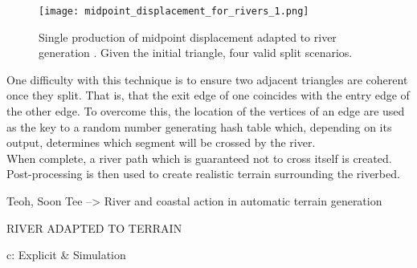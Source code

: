 \begin{figure}[h]
  \centering
	\label{Single production of midpoint displacement adapted to river generation. Given the initial triangle, four valid split scenarios. }
	\texttt{[image: midpoint\_displacement\_for\_rivers\_1.png]}
	\caption{Single production of midpoint displacement adapted to river generation \cite{Prusinkiewicz1993}. Given the initial triangle, four valid split scenarios.}
\end{figure}

One difficulty with this technique is to ensure two adjacent triangles are coherent once they split. That is, that the exit edge of one coincides with the entry edge of the other edge. To overcome this, the location of the vertices of an edge are used as the key to a random number generating hash table which, depending on its output, determines which segment will be crossed by the river.\\
When complete, a river path which is guaranteed not to cross itself is created. Post-processing is then used to create realistic terrain surrounding the riverbed.



Teoh, Soon Tee --> River and coastal action in automatic terrain generation

RIVER ADAPTED TO TERRAIN

c: Explicit & Simulation

